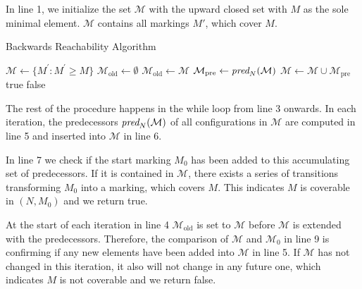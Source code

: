In line 1, we initialize the set $\mathcal{M}$ with the upward closed set with $M$ as the sole minimal element. $\mathcal{M}$ contains all markings $M'$, which cover $M$. 

\begin{algorithm}[htb]
\caption{Backwards Reachability Algorithm}\label{alg:bw}
\begin{algorithmic}[1]\smallskip
{}
\State $\mathcal{M} \gets \{ M^{'} : M^{'} \ge M \}$
\State $\mathcal{M}_{\text{old}} \gets \emptyset$
	\State $\mathcal{M}_{\text{old}} \gets \mathcal{M}$
	\State $\mathcal{M}_{\text{pre}} \gets \operatorname{\textit{pred}}_{N}(\mathcal{M})$
	\State $\mathcal{M} \gets \mathcal{M}  \cup \mathcal{M}_{\text{pre}}$
	\Return true
\EndIf
{}
    \Return false
\EndIf
\EndWhile
\smallskip
\end{algorithmic}
\end{algorithm}

The rest of the procedure happens in the while loop from line 3 onwards. In each iteration, the predecessors $\operatorname{\textit{pred}}_{N}(\mathcal{M})$ of all configurations in $\mathcal{M}$ are computed in line 5 and inserted into $\mathcal{M}$ in line 6. 
\par
In line 7 we check if the start marking $M_{0}$ has been added to this accumulating set of predecessors. If it is contained in $\mathcal{M}$, there exists a series of transitions transforming $M_{0}$ into a marking, which covers $M$. This indicates $M$ is coverable in $(N,M_{0})$ and we return true. 
\par
At the start of each iteration in line 4 $\mathcal{M}_{\text{old}}$ is set to $\mathcal{M}$ before $\mathcal{M}$ is extended with the predecessors. Therefore, the comparison of $\mathcal{M}$ and $\mathcal{M}_{0}$ in line 9 is confirming if any new elements have been added into $\mathcal{M}$ in line 5. If $\mathcal{M}$ has not changed in this iteration, it also will not change in any future one, which indicates $M$ is not coverable and we return false.
\par




